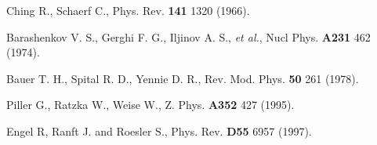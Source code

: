 \begin{thebibliography}{599}

 Ching R., Schaerf C., Phys. Rev. {\bf 141} 1320 (1966).

 Barashenkov V. S., Gerghi F. G., Iljinov A. S., {\it et al.},
Nucl Phys. {\bf A231} 462 (1974).

 Bauer T. H., Spital R. D., Yennie D. R., Rev. Mod. Phys. {\bf
50} 261 (1978).

 Piller G., Ratzka W., Weise W., Z. Phys. {\bf A352} 427 (1995).

 Engel R, Ranft J. and Roesler S., Phys. Rev.
 {\bf D55} 6957 (1997).
 
\end{thebibliography}

